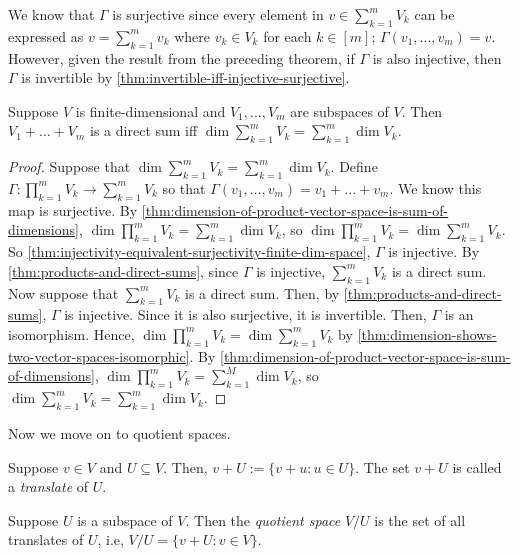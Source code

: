 \documentclass{article}
\begin{document}
\begin{remark}
  We know that $\Gamma$ is surjective since every element in $v \in
  \sum_{k=1}^m V_k$ can be expressed as $v = \sum_{k=1}^m v_k$ where
  $v_k \in V_k$ for each $k \in [m]$; $\Gamma(v_1, ..., v_m) =
  v$. However, given the result from the preceding theorem, if
  $\Gamma$ is also injective, then $\Gamma$ is invertible by
  \cref{thm:invertible-iff-injective-surjective}.
\end{remark}

\begin{theorem}
  \label{thm:sum-is-direct-sum-iff-dimensions-add-up}
  Suppose $V$ is finite-dimensional and $V_1, ..., V_m$ are subspaces
  of $V$. Then $V_1 + ... + V_m$ is a direct sum iff $\dim
  \sum_{k=1}^m V_k = \sum_{k=1}^m \dim V_k$.
\end{theorem}
\begin{proof}
  Suppose that $\dim \sum_{k=1}^m V_k = \sum_{k=1}^m \dim V_k$. Define
  $\Gamma: \prod_{k=1}^m V_k \rightarrow \sum_{k=1}^m V_k$ so that
  $\Gamma(v_1, ..., v_m) = v_1 + ... + v_m$. We know this map is
  surjective. By
  \cref{thm:dimension-of-product-vector-space-is-sum-of-dimensions},
  $\dim \prod_{k=1}^m V_k = \sum_{k=1}^m \dim V_k$, so $\dim
  \prod_{k=1}^m V_k = \dim \sum_{k=1}^m V_k$. So
  \cref{thm:injectivity-equivalent-surjectivity-finite-dim-space},
  $\Gamma$ is injective. By \cref{thm:products-and-direct-sums}, since
  $\Gamma$ is injective, $\sum_{k=1}^m V_k$ is a direct sum. \\
  Now suppose that $\sum_{k=1}^m V_k$ is a direct sum. Then, by
  \cref{thm:products-and-direct-sums}, $\Gamma$ is injective. Since it
  is also surjective, it is invertible. Then, $\Gamma$ is an
  isomorphism. Hence, $\dim \prod_{k=1}^m V_k = \dim \sum_{k=1}^m V_k$
  by \cref{thm:dimension-shows-two-vector-spaces-isomorphic}. By
  \cref{thm:dimension-of-product-vector-space-is-sum-of-dimensions},
  $\dim \prod_{k=1}^m V_k = \sum_{k=1}^M \dim V_k$, so $\dim
  \sum_{k=1}^m V_k = \sum_{k=1}^m \dim V_k$.
\end{proof}


Now we move on to quotient spaces.

\begin{definition}[translates]
  Suppose $v \in V$ and $U \subseteq V$. Then, $v + U := \{v + u: u
  \in U\}$. The set $v + U$ is called a \textit{translate} of $U$.
\end{definition}

\begin{definition}
  Suppose $U$ is a subspace of $V$. Then the \textit{quotient space}
  $V/U$ is the set of all translates of $U$, i.e, $V/U = \{v + U: v
  \in V\}$.
\end{definition}
\end{document}
